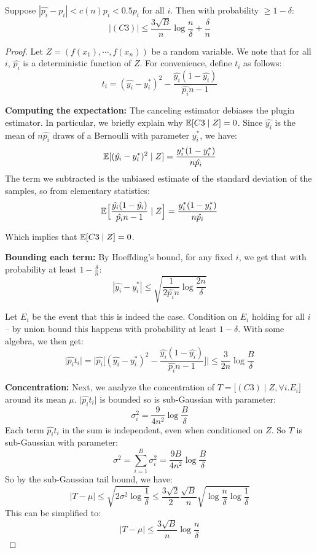\begin{lemma}[C3]
\label{lem:c3_bound}
Suppose $|\hat{p_i} - p_i| < c(n) p_i < 0.5 p_i$ for all $i$. Then with probability $\geq 1 - \delta$:
\[ |(C3)| \leq \frac{3\sqrt{B}}{n} \log{\frac{n}{\delta}} + \frac{\delta}{n} \]
\end{lemma}

\begin{proof}
Let $Z = (f(x_1), \cdots, f(x_n))$ be a random variable. We note that for all $i$, $\hat{p_i}$ is a deterministic function of $Z$. For convenience, define $t_i$ as follows:
\[ t_i = (\hat{y_i} - y_i^*)^2 - \frac{\hat{y_i}(1 - \hat{y_i})}{\hat{p_i}n-1} \]

\textbf{Computing the expectation:} The canceling estimator debiases the plugin estimator. In particular, we briefly explain why $\mathbb{E}[C3 \mid Z] = 0$. Since $\hat{y_i}$ is the mean of $n\hat{p_i}$ draws of a Bernoulli with parameter $y_i^*$, we have:
\[ \mathbb{E}[(\hat{y_i} - y_i^*)^2 \mid Z] = \frac{y_i^*(1 - y_i^*)}{n\hat{p_i}} \] 
The term we subtracted is the unbiased estimate of the standard deviation of the samples, so from elementary statistics:
\[ \mathbb{E}\Big[\frac{\hat{y_i}(1 - \hat{y_i})}{\hat{p_i}n-1} \mid Z\Big] = \frac{y_i^*(1 - y_i^*)}{n\hat{p_i}} \]

Which implies that $\mathbb{E}[C3 \mid Z] = 0$.

\textbf{Bounding each term:} By Hoeffding's bound, for any fixed $i$, we get that with probability at least $1 - \frac{\delta}{n}$: 
\[ |\hat{y_i} - y_i^*| \leq \sqrt{\frac{1}{2\hat{p_i}n} \log{\frac{2n}{\delta}}} \]

Let $E_i$ be the event that this is indeed the case. Condition on $E_i$ holding for all $i$ -- by union bound this happens with probability at least $1 - \delta$.
With some algebra, we then get:
\[ \lvert \hat{p_i}t_i \rvert = \Big\lvert \hat{p_i}\Big[ (\hat{y_i} - y_i^*)^2 - \frac{\hat{y_i}(1 - \hat{y_i})}{\hat{p_i}n-1} \Big] \Big\rvert \leq \frac{3}{2n} \log{\frac{B}{\delta}} \]

\textbf{Concentration:} Next, we analyze the concentration of $T = \big[(C3) \mid Z, \forall i. E_i\big]$ around its mean $\mu$. $\lvert \hat{p_i}t_i \rvert$ is bounded so is sub-Gaussian with parameter:
\[ \sigma_i^2 = \frac{9}{4n^2}\log{\frac{B}{\delta}} \]
Each term $\hat{p_i}t_i$ in the sum is independent, even when conditioned on $Z$.
So $T$ is sub-Gaussian with parameter:
\[ \sigma^2 = \sum_{i=1}^B \sigma_i^2 = \frac{9B}{4n^2}\log{\frac{B}{\delta}} \]
So by the sub-Gaussian tail bound, we have:
\[ \lvert T - \mu \rvert \leq \sqrt{2\sigma^2\log{\frac{1}{\delta}}} \leq \frac{3\sqrt{2}}{2} \frac{\sqrt{B}}{n} \sqrt{\log{\frac{n}{\delta}} \log{\frac{1}{\delta}}} \]
This can be simplified to:
\[ \lvert T - \mu \rvert \leq \frac{3\sqrt{B}}{n} \log{\frac{n}{\delta}} \]


\end{proof}
